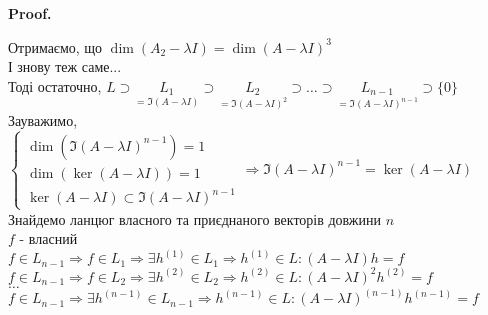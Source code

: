 \documentclass[a4paper, 10pt]{article}
\makeatletter
\theoremstyle{theoremdd}
\renewenvironment{proof}[1][Proof.\\]{\par
\pushQED{\hfill \qed}%
\normalfont \topsep6\p@\@plus6\p@\relax
\trivlist
\item\relax
{\bfseries
#1\@addpunct{.}}\hspace\labelsep\ignorespaces
}{%
\popQED\endtrivlist\@endpefalse
}
\makeatother
\begin{document}
\begin{proof}
Отримаємо, що $\dim (A_2 - \lambda I) = \dim (A-\lambda I)^3$\\
І знову теж саме...
\bigskip \\
Тоді остаточно, $L \supset \underset{=\Im(A-\lambda I)}{L_1} \supset \underset{=\Im(A-\lambda I)^2}{L_2} \supset \dots \supset \underset{=\Im(A-\lambda I)^{n-1}}{L_{n-1}} \supset \{0\}$\\
Зауважимо,\\
$\begin{cases}
\dim (\Im(A-\lambda I)^{n-1}) = 1\\
\dim (\ker (A-\lambda I)) = 1\\
\ker (A-\lambda I) \subset \Im(A-\lambda I)^{n-1}
\end{cases} \Rightarrow \Im(A-\lambda I)^{n-1} = \ker(A-\lambda I)
$\\
Знайдемо ланцюг власного та приєднаного векторів довжини $n$\\
$f$ - власний\\
$f \in L_{n-1} \Rightarrow f \in L_1 \Rightarrow \exists h^{(1)} \in L_1 \Rightarrow h^{(1)} \in L: (A-\lambda I)h = f$\\
$f \in L_{n-1} \Rightarrow f \in L_2 \Rightarrow \exists h^{(2)} \in L_2 \Rightarrow h^{(2)} \in L: (A-\lambda I)^2 h^{(2)} = f$\\
$\dots$\\
$f \in L_{n-1} \Rightarrow \exists h^{(n-1)} \in L_{n-1} \Rightarrow h^{(n-1)} \in L: (A-\lambda I)^{(n-1)}h^{(n-1)} = f$
\end{proof}
\end{document}
